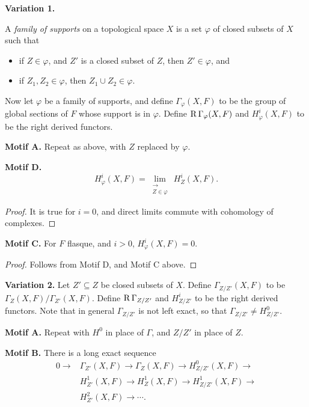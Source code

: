 \medskip\noindent\textbf{Variation 1.}
\begin{definition*}
A \emph{family of supports} on a topological space $X$ is a set $\varphi$ of closed subsets of $X$ such that
\begin{itemize}
\item[(a)] if $Z\in\varphi$, and $Z'$ is a closed subset of $Z$, then $Z'\in\varphi$, and
\item[(b)] if $Z_1,Z_2\in\varphi$, then $Z_1\cup Z_2\in\varphi$.
\end{itemize}
\end{definition*}

Now let $\varphi$ be a family of supports, and define $\Gamma_\varphi(X,F)$ to be the group of global sections of $F$ whose support is in $\varphi$. Define $\operatorname{R}\Gamma_\varphi(X,F)$ and $H^i_\varphi(X,F)$ to be the right derived functors.

\medskip\noindent\textbf{Motif A.} Repeat as above, with $Z$ replaced by $\varphi$.

\medskip\noindent\textbf{Motif D.}
\[
H_{\varphi}^{i}(X,F)=\lim_{\substack{\longrightarrow \\ Z\in\varphi}}\,H_{Z}^{i}(X,F).
\]
\begin{proof}
It is true for $i=0$, and direct limits commute with cohomology of complexes.
\end{proof}

\medskip\noindent\textbf{Motif C.} For $F$ flasque, and $i>0$, $H_{\varphi}^{i}(X,F)=0$.
\begin{proof}
Follows from Motif D, and Motif C above.
\end{proof}

\medskip\noindent\textbf{Variation 2.}
Let $Z'\subseteq Z$ be closed subsets of $X$. Define $\Gamma_{Z/Z'}(X,F)$ to be $\Gamma_Z(X,F)/\Gamma_{Z'}(X,F)$. Define $\operatorname{R}\Gamma_{Z/Z'}$ and $H^i_{Z/Z'}$ to be the right derived functors. Note that in general $\Gamma_{Z/Z'}$ is not left exact, so that $\Gamma_{Z/Z'}\neq H^0_{Z/Z'}$.

\medskip\noindent\textbf{Motif A.} Repeat with $H^0$ in place of $\Gamma$, and $Z/Z'$ in place of $Z$.

\medskip\noindent\textbf{Motif B.} There is a long exact sequence
\begin{align*}
0\longrightarrow &\Gamma_{Z'}(X,F)\longrightarrow \Gamma_Z(X,F)\longrightarrow H_{Z/Z'}^0(X,F)\longrightarrow\\
&H_{Z'}^1(X,F)\longrightarrow H_Z^1(X,F)\longrightarrow H_{Z/Z'}^1(X,F)\longrightarrow\\
&H_{Z'}^2(X,F)\longrightarrow\cdots.
\end{align*}


